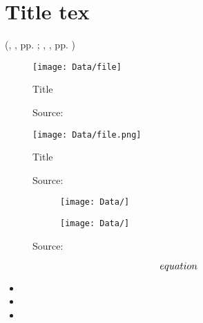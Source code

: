 
\section[Title]{\texorpdfstring{Title tex}{Title pdf}}


\textcolor{HCU}{}
\textcolor{red1}{}




(\citeauthor{}, \citeyearNP{}, pp. ; \citeauthor{}, \citeyearNP{}, pp. )


\begin{figure}[H]
	\centering
	\texttt{[image: Data/file]}
	\caption{Title}
	\caption*{Source: \citeA{}}
	\label{fig:}
\end{figure}


\begin{figure}[H]
	\centering
	\texttt{[image: Data/file.png]}
	\caption{Title}
	\caption*{Source: \citeA{}}
	\label{fig:}
\end{figure}


\begin{figure}[H]
	\begin{subfigure}[c]{0.48\textwidth}
		\texttt{[image: Data/]}
		\subcaption{}
		\label{fig:}
	\end{subfigure}
	\hfill
	\begin{subfigure}[c]{0.48\textwidth}
		\texttt{[image: Data/]}
		\subcaption{}
		\label{fig:}
	\end{subfigure}
	\caption{}
	\caption*{Source: \citeA[]{}}
	\label{fig:}
\end{figure}


\begin{equation}
	\numberwithin{equation}{section}
	equation \label{eq:Label} \\
\end{equation}





\begin{itemize}	
	\setlength{\itemsep}{-2pt}
	\item 
	\item 
	\item 
\end{itemize}


